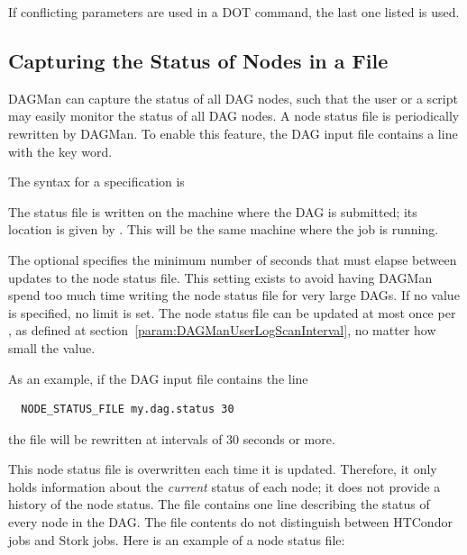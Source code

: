 If conflicting parameters are used in a DOT command, the last one
listed is used.

\subsection{\label{sec:DAG-node-status}Capturing the Status of Nodes in a File}

DAGMan can capture the status of all DAG nodes,
such that the user or a script may easily monitor the status of all DAG nodes.
A node status file is periodically rewritten by DAGMan.
To enable this feature, the DAG input file contains a line with the
 key word.

The syntax for a  specification is

  

The status file is written on the machine where the DAG is submitted;
its location is given by .  
This will be the same machine where the  job is running.

The optional  specifies the minimum number of seconds
that must elapse between updates to the node status file.
This setting exists to avoid having DAGMan spend too much time writing
the node status file for very large DAGs.
If no value is specified, no limit is set.
The node status file can be updated at most once
per ,
as defined at section~\ref{param:DAGManUserLogScanInterval},
no matter how small the  value.

As an example, if the DAG input file contains the line
\begin{verbatim}
  NODE_STATUS_FILE my.dag.status 30
\end{verbatim}
the file  will be rewritten at intervals of 30 seconds
or more.

This node status file is overwritten each time it is updated.
Therefore, it only holds information about the \emph{current} status 
of each node; it does not provide a history of the node status.
The file contains one line describing the status of every node in the DAG.
The file contents do not distinguish between HTCondor jobs and Stork jobs.
Here is an example of a node status file:

